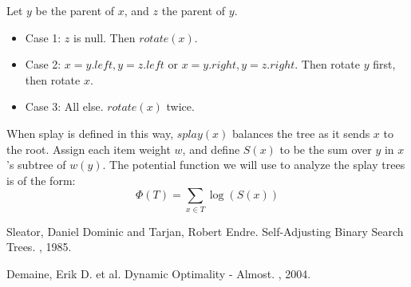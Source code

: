 \documentclass[11pt]{article}
\begin{document}
Let $y$ be the parent of $x$, and $z$ the parent of $y$. 
\begin{itemize}
\item Case 1: $z$ is null. Then $rotate(x)$.
\item Case 2: $x=y.left, y=z.left$ or $x=y.right, y=z.right$. Then rotate $y$ first, then rotate $x$. 
\item Case 3: All else. $rotate(x)$ twice.
\end{itemize}
When splay is defined in this way, $splay(x)$ balances the tree as it sends $x$ to the root. Assign each item  weight $w$, and define $S(x)$ to be the sum over $y$ in $x$'s subtree of $w(y)$. The potential function we will use to analyze the splay trees is of the form:
\[\Phi(T)=\sum_{x\in T}\log (S(x))\]




\begin{thebibliography}{42}

Sleator, Daniel Dominic and Tarjan, Robert Endre. 
\newblock Self-Adjusting Binary Search Trees.
, 1985.

Demaine, Erik D. et al.
\newblock Dynamic Optimality - Almost.
, 2004.

\end{thebibliography}
\end{document}
